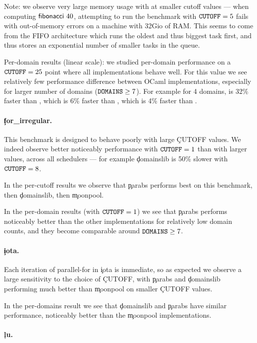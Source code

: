 Note: we observe very large memory usage with \Moonpool at smaller cutoff values --- when computing $\l{fibonacci}\ 40$, attempting to run the benchmark with $\texttt{CUTOFF} = 5$ fails with out-of-memory errors on a machine with 32Gio of RAM.
This seems to come from the FIFO architecture which runs the oldest and thus biggest task first, and thus stores an exponential number of smaller tasks in the queue.

Per-domain results (linear scale): we studied per-domain performance on a $\texttt{CUTOFF}=25$ point where all implementations behave well. For this value we see relatively few performance difference between OCaml implementations, especially for larger number of domains ($\texttt{DOMAINS} \geq 7$). For example for 4 domains, \Taskflow is 32\% faster than \Parabs, which is 6\% faster than \Domainslib, which is 4\% faster than \Moonpool.

\paragraph{\c{for\_irregular}.}

This benchmark is designed to behave poorly with large \c{CUTOFF} values.
We indeed observe better noticeably performance with $\texttt{CUTOFF} = 1$ than with larger values, across all schedulers --- for example \c{domainslib} is 50\% slower with $\texttt{CUTOFF} = 8$.

In the per-cutoff results we observe that \c{parabs} performs best on this benchmark, then \c{domainslib}, then \c{moonpool}.

In the per-domain results (with $\texttt{CUTOFF} = 1$) we see that \c{parabs} performs noticeably better than the other implementations for relatively low domain counts, and they become comparable around $\texttt{DOMAINS} \geq 7$.

\paragraph{\c{iota}.}

Each iteration of parallel-for in \c{iota} is immediate, so as expected we observe a large sensitivity to the choice of \c{CUTOFF}, with \c{parabs} and \c{domainslib} performing much better than \c{moonpool} on smaller \c{CUTOFF} values.

In the per-domains result we see that \c{domainslib} and \c{parabs} have similar performance, noticeably better than the \c{moonpool} implementations.

\paragraph{\c{lu}.}

